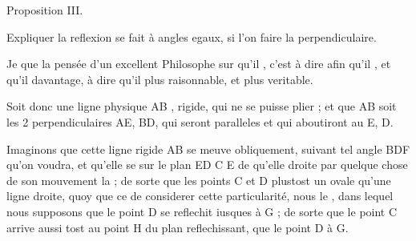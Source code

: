 \documentclass[11pt,a4paper]{article}
\begin{document}
Proposition III.

Expliquer  la reflexion se fait à angles egaux, si l'on \ill{} \ill{} faire la  perpendiculaire.

Je  que la pensée d'un excellent Philosophe sur \ill{} \struck{\ill{}} \ill{} qu'il , c'est à dire \struck{\ill{}} afin qu'il  , et qu'il  davantage,  à dire qu'il  plus raisonnable, et plus veritable.

Soit donc une ligne physique AB \struck{\ill{} \ill{} \ill{}}, \struck{\ill{} \ill{} \ill{} \ill{} \ill{} \ill{} \ill{} \ill{}} rigide, qui ne se puisse plier ; et que AB soit  \ill{} les 2 perpendiculaires AE, BD, qui seront paralleles et qui aboutiront au  \struck{\ill{} \ill{} \ill{} \ill{}} E, D.

Imaginons que cette ligne rigide AB se meuve obliquement, suivant tel angle BDF qu'on voudra, et qu'elle se  sur le plan ED \struck{\ill{}} \ill{} \ill{} \ill{} C  E \ill{} \ill{} de  \struck{\ill{}} qu'elle  droite par   \struck{\ill{}} \ill{} quelque chose de son mouvement la \ill{} ; de sorte que les points C et D  plustost un ovale qu'une ligne droite, quoy que \struck{\ill{}} \ill{} \ill{} \ill{} \ill{} \ill{} ce  de considerer cette particularité, nous  le , dans lequel nous supposons que le point D se reflechit iusques à G ; de sorte que le point C arrive aussi tost au \struck{\ill{}} point H du plan reflechissant, que le point D à G.
\end{document}
